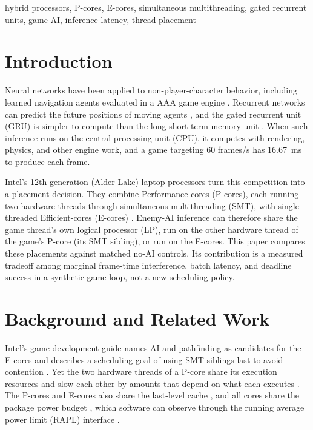 \documentclass[conference]{IEEEtran}
\begin{document}
\begin{IEEEkeywords}
hybrid processors, P-cores, E-cores, simultaneous multithreading, gated recurrent units, game AI, inference latency, thread placement
\end{IEEEkeywords}

\section{Introduction}
Neural networks have been applied to non-player-character behavior, including learned navigation agents evaluated in a AAA game engine \cite{alonso}. Recurrent networks can predict the future positions of moving agents \cite{alahi}, and the gated recurrent unit (GRU) is simpler to compute than the long short-term memory unit \cite{cho}. When such inference runs on the central processing unit (CPU), it competes with rendering, physics, and other engine work, and a game targeting 60 frames/s has 16.67~ms to produce each frame.

Intel's 12th-generation (Alder Lake) laptop processors turn this competition into a placement decision. They combine Performance-cores (P-cores), each running two hardware threads through simultaneous multithreading (SMT), with single-threaded Efficient-cores (E-cores) \cite{rotem2022}. Enemy-AI inference can therefore share the game thread's own logical processor (LP), run on the other hardware thread of the game's P-core (its SMT sibling), or run on the E-cores. This paper compares these placements against matched no-AI controls. Its contribution is a measured tradeoff among marginal frame-time interference, batch latency, and deadline success in a synthetic game loop, not a new scheduling policy.

\section{Background and Related Work}
Intel's game-development guide names AI and pathfinding as candidates for the E-cores and describes a scheduling goal of using SMT siblings last to avoid contention \cite{gerasimov}. Yet the two hardware threads of a P-core share its execution resources \cite{tullsen} and slow each other by amounts that depend on what each executes \cite{snavely}. The P-cores and E-cores also share the last-level cache \cite{gerasimov}, and all cores share the package power budget \cite{rotem2012}, which software can observe through the running average power limit (RAPL) interface \cite{khan}.
\end{document}
